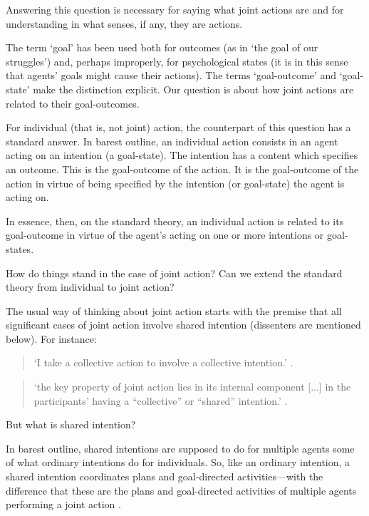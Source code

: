 \documentclass[12pt,a4paper]{extarticle}
\begin{document}
Answering this question is necessary for saying what joint actions are and for understanding in what senses, if any, they are actions.

The term `goal' has been used both for outcomes (as in `the goal of our struggles') and, perhaps improperly, for psychological states (it is in this sense that agents' goals might cause their actions).  The terms `goal-outcome' and `goal-state' make the distinction explicit.  Our question is about how joint actions are related to their goal-outcomes.

For individual (that is, not joint) action, the counterpart of this question has a standard answer.  In barest outline, an individual action consists in an agent acting on an intention (a goal-state).  The intention has a content which specifies an outcome.
This is the goal-outcome of the action.
It is the goal-outcome of the action in virtue of being specified by the intention (or goal-state) the agent is acting on. 

In essence, then, on the standard theory, an individual action is related to its goal-outcome in virtue of the agent's acting on one or more intentions or goal-states.


How do things stand in the case of joint action?  Can we extend the standard theory from individual to joint action?  


The usual way of thinking about joint action starts with the premise that all significant cases of joint action involve shared intention (dissenters are mentioned below).  For instance:  
\begin{quote} 
`I take a collective action to involve a collective intention.'  \citep[p.\ 5]{Gilbert:2006wr}.
\end{quote}
\begin{quote}
`the key property of joint action lies in its internal component [...] in the participants’ having a “collective” or “shared” intention.' \citep[pp. 444-5]{alonso_shared_2009}.
\end{quote}


But what is shared intention?

In barest outline, shared intentions are supposed to do for multiple agents some of what ordinary intentions do for individuals.  So, like an ordinary intention, a shared intention coordinates plans and goal-directed activities---with the difference that these are the plans and goal-directed activities of multiple agents performing a joint action \citep{Bratman:1993je}.
\end{document}
